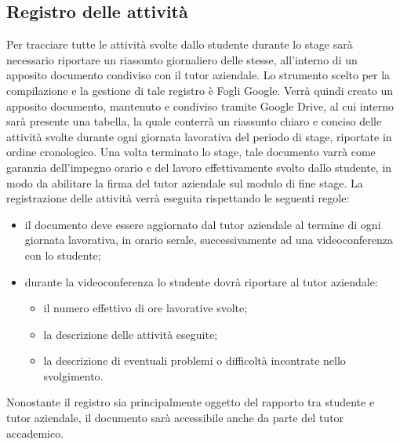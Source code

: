 	\subsection{Registro delle attività}
		Per tracciare tutte le attività svolte dallo studente durante lo stage sarà necessario riportare un riassunto giornaliero delle stesse, all’interno di un apposito documento condiviso con il tutor aziendale.
		\newline
		Lo strumento scelto per la compilazione e la gestione di tale registro è Fogli Google. Verrà quindi creato un apposito documento, mantenuto e condiviso tramite Google Drive, al cui interno sarà presente una tabella, la quale conterrà un riassunto chiaro e conciso delle attività svolte durante ogni giornata lavorativa del periodo di stage, riportate in ordine cronologico.
		\newline
		Una volta terminato lo stage, tale documento varrà come garanzia dell'impegno orario e del lavoro effettivamente svolto dallo studente, in modo da abilitare la firma del tutor aziendale sul modulo di fine stage.
		\newline
		La registrazione delle attività verrà eseguita rispettando le seguenti regole:
		\begin{itemize}
			\item il documento deve essere aggiornato dal tutor aziendale al termine di ogni giornata lavorativa, in orario serale, successivamente ad una videoconferenza con lo studente;
			\item durante la videoconferenza lo studente dovrà riportare al tutor aziendale:
			\begin{itemize}
				\item il numero effettivo di ore lavorative svolte;
				\item la descrizione delle attività eseguite;
				\item la descrizione di eventuali problemi o difficoltà incontrate nello svolgimento.
			\end{itemize}
		\end{itemize}
		Nonostante il registro sia principalmente oggetto del rapporto tra studente e tutor aziendale, il documento sarà accessibile anche da parte del tutor accademico.

	
